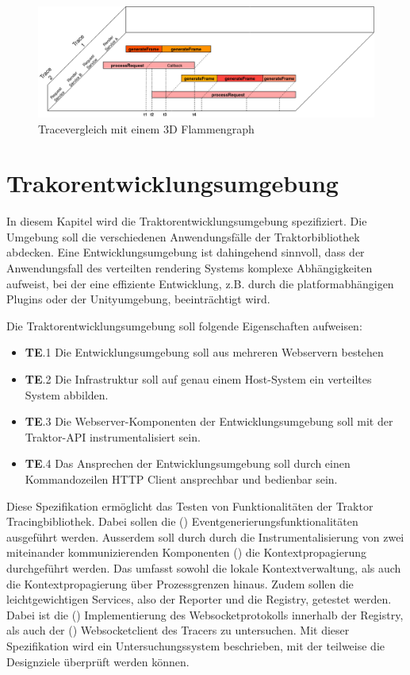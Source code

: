 \begin{figure}[!ht]
	\centering
	\includegraphics[scale=0.4]{img/Design/3D-Flammengraph-Vergleich.png}
	\caption[Darstellungsbeispiel eines Tracevergleich mit einem 3D Flammengraph]{ Tracevergleich mit einem 3D Flammengraph}
	\label{fig:3D-Flammengraph-Vergleich}
\end{figure}

\section{Trakorentwicklungsumgebung}
\label{section:Trakorentwicklungsumgebung}
In diesem Kapitel wird die Traktorentwicklungsumgebung spezifiziert. Die Umgebung soll die verschiedenen Anwendungsfälle der Traktorbibliothek abdecken. Eine Entwicklungsumgebung ist dahingehend sinnvoll, dass der Anwendungsfall des verteilten rendering Systems komplexe Abhängigkeiten aufweist, bei der eine effiziente Entwicklung, z.B. durch die platformabhängigen Plugins oder der Unityumgebung, beeinträchtigt wird.

Die Traktorentwicklungsumgebung soll folgende Eigenschaften aufweisen:

\begin{itemize}
	\item \textbf{TE}.1 Die Entwicklungsumgebung soll aus mehreren Webservern bestehen
	\item  \textbf{TE}.2 Die Infrastruktur soll auf genau einem Host-System ein verteiltes System abbilden.
	\item  \textbf{TE}.3 Die Webserver-Komponenten der Entwicklungsumgebung soll mit der Traktor-API instrumentalisiert sein.
	\item  \textbf{TE}.4 Das Ansprechen der Entwicklungsumgebung soll durch einen Kommandozeilen HTTP Client ansprechbar und bedienbar sein.
\end{itemize}

Diese Spezifikation ermöglicht das Testen von Funktionalitäten der Traktor Tracingbibliothek. Dabei sollen die () Eventgenerierungsfunktionalitäten ausgeführt werden. Ausserdem soll durch durch die Instrumentalisierung von zwei miteinander kommunizierenden Komponenten () die Kontextpropagierung durchgeführt werden. Das umfasst sowohl die lokale Kontextverwaltung, als auch die Kontextpropagierung über Prozessgrenzen hinaus. Zudem sollen die leichtgewichtigen Services, also der Reporter und die Registry, getestet werden. Dabei ist die () Implementierung des Websocketprotokolls innerhalb der Registry, als auch der () Websocketclient des Tracers zu untersuchen. Mit dieser Spezifikation wird ein Untersuchungssystem beschrieben, mit der teilweise die Designziele überprüft werden können. 
